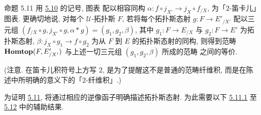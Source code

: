 \begin{enonce*}{命题 5.11}
用 \hyperref[IV.subsec5.10]{5.10} 的记号, 图表  配以相容同构 $\alpha:f\circ j_{X'}\rightarrow j_X\circ f_{/X}$, 为「$2$-笛卡儿」图表. 更确切地说, 对每个 $𝒰$-拓扑斯 $F$, 若将每个拓扑斯态射 $g:F\rightarrow E'_{/X'}$ 配以三元组 $(f_{/X}\circ g, j_{X'}\circ g,\alpha\ast g)=(g_1,g_2,\beta)$, 其中 $g_1:F\rightarrow E_{/X}$ 与 $g_2:F\rightarrow E'$ 为拓扑斯态射, $\beta:j_X\circ g_1\rightarrow f\circ g_2$ 为从 $F$ 到 $E$ 的拓扑斯态射的同构, 则得到范畴 $\operatorname{\mathbf{Homtop}}(F,E'_{/X'})$ 与上述一切三元组 $(g_1,g_2,\beta)$ 所成的范畴
之间的等价.
\end{enonce*}

(注意. 在笛卡儿积符号上方写 $2$, 是为了提醒这不是普通的范畴纤维积, 而是在陈述中所明确的意义下的「$2$-纤维积」.)

为证明 \hyperref[IV.prop5.11]{5.11}, 将通过相应的逆像函子明确描述拓扑斯态射. 为此需要以下 \hyperref[IV.subsubsec5.11.1]{5.11.1} 至 \hyperref[IV.prop5.12]{5.12} 中的辅助结果.

\setcounter{subsection}{11} \setcounter{subsubsection}{0}
